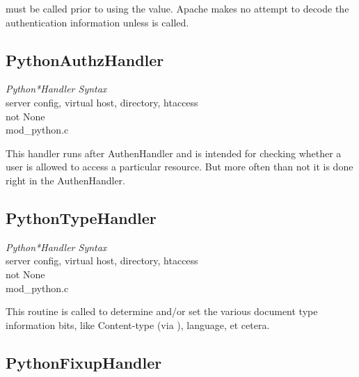   must be called prior to using the
 value. Apache makes no attempt to decode the
authentication information unless  is called.

\subsection{PythonAuthzHandler\label{dir-handlers-auh}}

\emph{Python*Handler Syntax}\\
server config, virtual host, directory, htaccess\\
not None\\
mod_python.c

This handler runs after AuthenHandler and is intended for checking
whether a user is allowed to access a particular resource. But more
often than not it is done right in the AuthenHandler.

\subsection{PythonTypeHandler\label{dir-handlers-tph}}

\emph{Python*Handler Syntax}\\
server config, virtual host, directory, htaccess\\
not None\\
mod_python.c

This routine is called to determine and/or set the various document
type information bits, like Content-type (via ),
language, et cetera.

\subsection{PythonFixupHandler\label{dir-handlers-fuh}}

